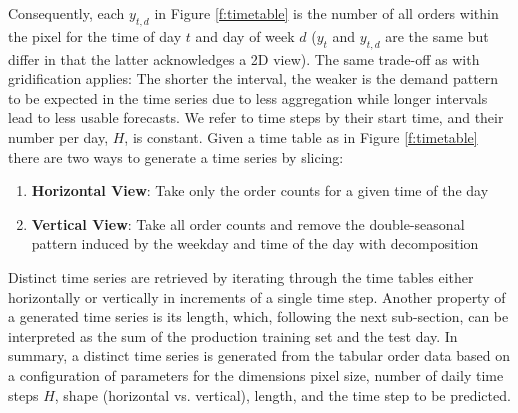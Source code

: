 Consequently, each $y_{t,d}$ in Figure \ref{f:timetable} is the number of
    all orders within the pixel for the time of day $t$ and day of week
    $d$ ($y_t$ and $y_{t,d}$ are the same but differ in that the latter
    acknowledges a 2D view).
The same trade-off as with gridification applies:
The shorter the interval, the weaker is the demand pattern to be expected in
    the time series due to less aggregation while longer intervals lead to
    less usable forecasts.
We refer to time steps by their start time, and their number per day, $H$,
    is constant.
Given a time table as in Figure \ref{f:timetable} there are two ways to
    generate a time series by slicing:
\begin{enumerate}
    \item \textbf{Horizontal View}:
    Take only the order counts for a given time of the day
    \item \textbf{Vertical View}:
    Take all order counts and remove the double-seasonal pattern induced
    by the weekday and time of the day with decomposition
\end{enumerate}
Distinct time series are retrieved by iterating through the time tables either
    horizontally or vertically in increments of a single time step.
Another property of a generated time series is its length, which, following
    the next sub-section, can be interpreted as the sum of the production
    training set and the test day.
In summary, a distinct time series is generated from the tabular order data
    based on a configuration of parameters for the dimensions pixel size,
    number of daily time steps $H$, shape (horizontal vs. vertical), length,
    and the time step to be predicted.
